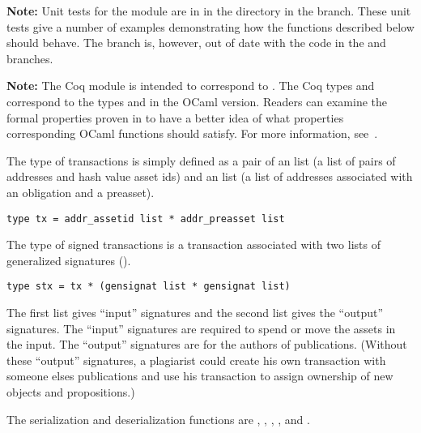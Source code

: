 {\bf{Note:}} Unit tests for the {} module are in {}
in the {}
directory in the {} branch.
These unit tests give a number of examples demonstrating how the functions described below should behave.
The {} branch is, however, out of date with the code in the {} and {} branches.

{\bf{Note:}} The Coq module {} is intended to correspond to {}.
The Coq types {} and {} correspond to the types {} and {} in the OCaml version.
Readers can examine the formal properties proven in {} to have a better
idea of what properties corresponding OCaml functions should satisfy.
For more information, see~\cite{White2015b}.

The type {} of transactions is simply defined as a pair of
an {} list (a list of pairs of addresses and hash value asset ids)
and an {} list (a list of addresses associated with an obligation and a preasset).
\begin{verbatim}
type tx = addr_assetid list * addr_preasset list
\end{verbatim}

The type {} of signed transactions is a transaction associated
with two lists of generalized signatures ({}).
\begin{verbatim}
type stx = tx * (gensignat list * gensignat list)
\end{verbatim}
The first list gives ``input'' signatures and the second list gives the ``output'' signatures.
The ``input'' signatures are required to spend or move the assets in the input.
The ``output'' signatures are for the authors of publications.
(Without these ``output'' signatures, a plagiarist could create his own transaction
with someone elses publications and use his transaction to assign ownership of
new objects and propositions.)

The serialization and deserialization functions are
{},
{},
{},
{},
{}
and
{}.

